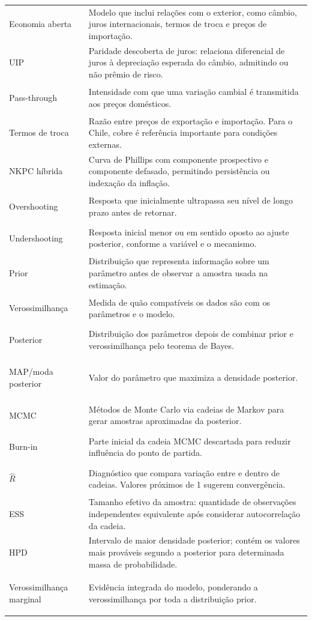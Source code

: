 \documentclass[11pt,a4paper]{article}
\begin{document}
\begin{longtable}{>{\bfseries\raggedright\arraybackslash}p{}>{\raggedright\arraybackslash}p{}}
Economia aberta & Modelo que inclui relações com o exterior, como câmbio, juros internacionais,
termos de troca e preços de importação. \\
UIP & Paridade descoberta de juros: relaciona diferencial de juros à depreciação esperada do
câmbio, admitindo ou não prêmio de risco. \\
Pass-through & Intensidade com que uma variação cambial é transmitida aos preços domésticos. \\
Termos de troca & Razão entre preços de exportação e importação. Para o Chile, cobre é referência
importante para condições externas. \\
NKPC híbrida & Curva de Phillips com componente prospectivo e componente defasado, permitindo
persistência ou indexação da inflação. \\
Overshooting & Resposta que inicialmente ultrapassa seu nível de longo prazo antes de retornar. \\
Undershooting & Resposta inicial menor ou em sentido oposto ao ajuste posterior, conforme a
variável e o mecanismo. \\
Prior & Distribuição que representa informação sobre um parâmetro antes de observar a amostra
usada na estimação. \\
Verossimilhança & Medida de quão compatíveis os dados são com os parâmetros e o modelo. \\
Posterior & Distribuição dos parâmetros depois de combinar prior e verossimilhança pelo teorema
de Bayes. \\
MAP/moda posterior & Valor do parâmetro que maximiza a densidade posterior. \\
MCMC & Métodos de Monte Carlo via cadeias de Markov para gerar amostras aproximadas da posterior. \\
Burn-in & Parte inicial da cadeia MCMC descartada para reduzir influência do ponto de partida. \\
\(\widehat R\) & Diagnóstico que compara variação entre e dentro de cadeias. Valores próximos de 1
sugerem convergência. \\
ESS & Tamanho efetivo da amostra: quantidade de observações independentes equivalente após
considerar autocorrelação da cadeia. \\
HPD & Intervalo de maior densidade posterior; contém os valores mais prováveis segundo a posterior
para determinada massa de probabilidade. \\
Verossimilhança marginal & Evidência integrada do modelo, ponderando a verossimilhança por toda a
distribuição prior. \\

\end{longtable}
\end{document}
